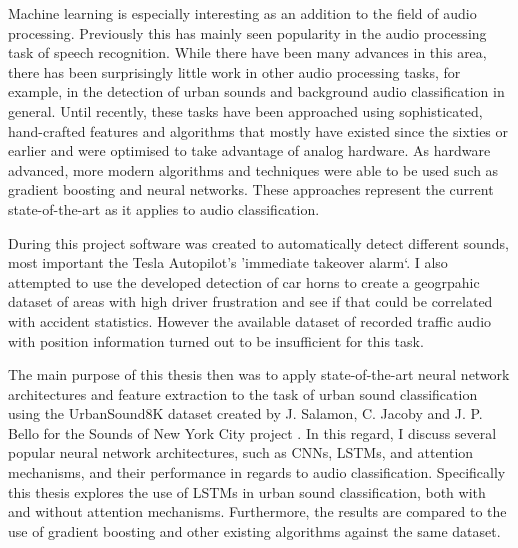 
Machine learning is especially interesting as an addition to the field of audio processing. Previously this has mainly seen popularity in the audio processing task of speech recognition. While there have been many advances in this area, there has been surprisingly little work in other audio processing tasks, for example, in the detection of urban sounds and background audio classification in general. Until recently, these tasks have been approached using sophisticated, hand-crafted features and algorithms that mostly have existed since the sixties or earlier and were optimised to take advantage of analog hardware. As hardware advanced, more modern algorithms and techniques were able to be used such as gradient boosting and neural networks. These approaches represent the current state-of-the-art as it applies to audio classification.



During this project software was created to automatically detect different sounds, most important the Tesla Autopilot's 'immediate takeover alarm`. I also attempted to use the developed detection of car horns to create a geogrpahic dataset of areas with high driver frustration and see if that could be correlated with accident statistics. However the available dataset of recorded traffic audio with position information turned out to be insufficient for this task.

The main purpose of this thesis then was to apply state-of-the-art neural network architectures and feature extraction to the task of urban sound classification using the UrbanSound8K dataset created by J. Salamon, C. Jacoby and J. P. Bello for the Sounds of New York City project \cite{Salamon:UrbanSound:ACMMM:14}. In this regard, I discuss several popular neural network architectures, such as CNNs, LSTMs, and attention mechanisms, and their performance in regards to audio classification. Specifically this thesis explores the use of LSTMs in urban sound classification, both with and without attention mechanisms. Furthermore, the results are compared to the use of gradient boosting and other existing algorithms against the same dataset.

